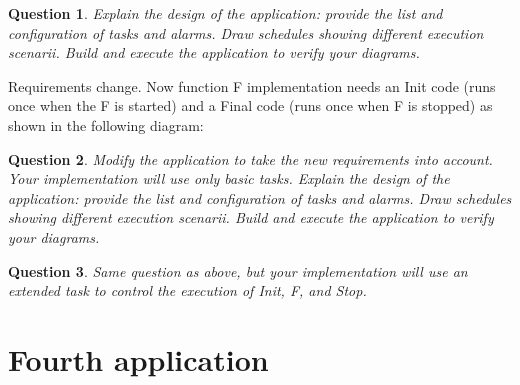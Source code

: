 \documentclass[11pt]{report}
\newtheorem{ex}{Question}
\begin{document}
\begin{ex}
    Explain the design of the application: provide the list and configuration of tasks and alarms.
    Draw schedules showing different execution scenarii.
    Build and execute the application to verify your diagrams.
\end{ex}

Requirements change. Now function F implementation needs an Init code
(runs once when the F is started) and a Final code (runs once when F is stopped) as shown in the following diagram:

\begin{center}
\begin{adjustbox}{width=14cm,keepaspectratio}
\end{adjustbox}
\end{center}


\begin{ex}
    Modify the application to take the new requirements into account.
    Your implementation will use only basic tasks.
    Explain the design of the application: provide the list and configuration of tasks and alarms.
    Draw schedules showing different execution scenarii.
    Build and execute the application to verify your diagrams.
\end{ex}

\begin{ex}
    Same question as above, but your implementation will use an extended task to control the execution of Init, F, and Stop.
\end{ex}

\section{Fourth application}
\end{document}
